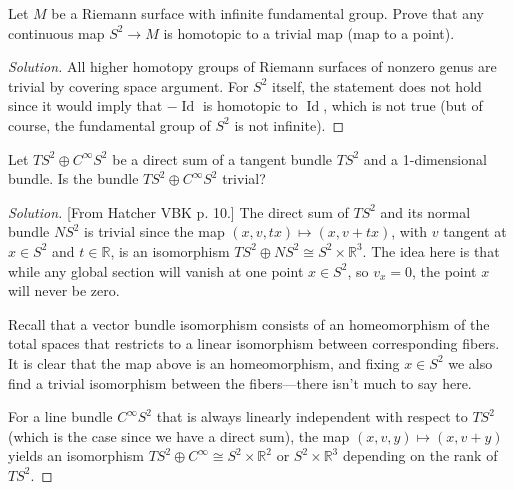 \begin{manualexercise}{5.2}
	Let $M$ be a Riemann surface with infinite fundamental group. Prove that any continuous map $S^{2}\to M$ is homotopic to a trivial map (map to a point).
\end{manualexercise}

\begin{proof}[Solution]

	All higher homotopy groups of Riemann surfaces of nonzero genus are trivial by covering space argument. For $S^{2}$ itself, the statement does not hold since it would imply that $-\operatorname{Id}$ is homotopic to $\operatorname{Id}$, which is not true (but of course, the fundamental group of $S^2$ is not infinite).
\end{proof}

\begin{manualexercise}{5.8}
	Let $TS^{2}\oplus C^{\infty} S^{2}$ be a direct sum of a tangent bundle $TS^{2}$ and a 1-dimensional bundle. Is the bundle $TS^{2}\oplus C^{\infty} S^{2}$ trivial?
\end{manualexercise}

\begin{proof}[Solution]
	[From Hatcher VBK p. 10.] The direct sum of $TS^{2}$ and its normal bundle $NS^{2}$ is trivial since the map $(x,v,tx)\mapsto (x,v+t x)$, with $v$ tangent at $x\in S^{2}$ and $t\in \mathbb{R}$, is an isomorphism $TS^{2}\oplus NS^{2}\cong S^{2}\times \mathbb{R}^{3}$. The idea here is that while any global section will vanish at one point $x\in S^{2}$, so $v_{x}=0$, the point $x$ will never be zero.

	Recall that a vector bundle isomorphism consists of an homeomorphism of the total spaces that restricts to a linear isomorphism between corresponding fibers. It is clear that the map above is an homeomorphism, and fixing $x \in S^{2}$ we also find a trivial isomorphism between the fibers---there isn't much to say here.

	For a line bundle $C^{\infty} S^{2}$ that is always linearly independent with respect to $TS^{2}$ (which is the case since we have a direct sum), the map $(x,v,y)\mapsto (x,v+y)$ yields an isomorphism $TS^{2}\oplus C^{\infty} \cong S^{2}\times \mathbb{R}^{2}$ or $S^{2}\times \mathbb{R}^{3}$ depending on the rank of $TS^{2}$.
\end{proof}


